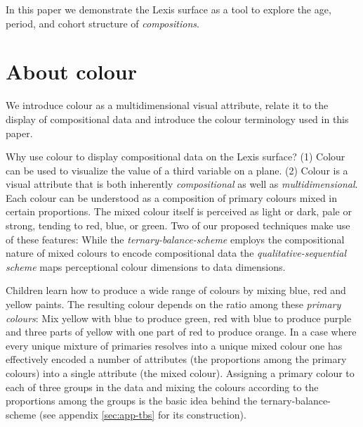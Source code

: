 \documentclass[parskip=half]{scrartcl}
\begin{document}
In this paper we demonstrate the Lexis surface as a tool to explore the age, period, and cohort structure of \emph{compositions}.

\clearpage

\section{About colour} %
\label{sec:colour}

We introduce colour as a multidimensional visual attribute, relate it to the display of compositional data and introduce the colour terminology used in this paper.

Why use colour to display compositional data on the Lexis surface?
  (1) Colour can be used to visualize the value of a third variable on a plane.
  (2) Colour is a visual attribute that is both inherently \emph{compositional} as well as \emph{multidimensional}. Each colour can be understood as a composition of primary colours mixed in certain proportions. The mixed colour itself is perceived as light or dark, pale or strong, tending to red, blue, or green. Two of our proposed techniques make use of these features: While the \emph{ternary-balance-scheme} employs the compositional nature of mixed colours to encode compositional data the \emph{qualitative-sequential scheme} maps perceptional colour dimensions to data dimensions.

Children learn how to produce a wide range of colours by mixing blue, red and yellow paints. The resulting colour depends on the ratio among these \emph{primary colours}: Mix yellow with blue to produce green, red with blue to produce purple and three parts of yellow with one part of red to produce orange. In a case where every unique mixture of primaries resolves into a unique mixed colour one has effectively encoded a number of attributes (the proportions among the primary colours) into a single attribute (the mixed colour). Assigning a primary colour to each of three groups in the data and mixing the colours according to the proportions among the groups is the basic idea behind the ternary-balance-scheme (see appendix \ref{sec:app-tbs} for its construction).
\end{document}
